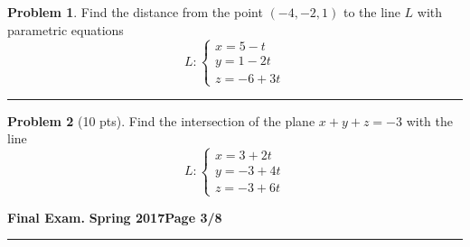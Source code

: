 \documentclass[12pt]{article}
\theoremstyle{definition}
\newtheorem{problem}{Problem}
\begin{document}
\bigskip
\begin{problem}
Find the distance from the point $(-4,-2,1)$ to the line $L$ with parametric equations
\begin{equation*}
L : \begin{cases}
x = 5 -t \\
y = 1 - 2t \\
z = -6 + 3t
\end{cases}
\end{equation*}
\vspace{6cm}
\begin{flushright}
\end{flushright}
\end{problem}
\hrule
\begin{problem}[10 pts]
Find the intersection of the plane $x+y+z=-3$ with the line
\begin{equation*}
L : \begin{cases}
x = 3 + 2t \\
y = -3 + 4t \\
z = -3 + 6t
\end{cases}
\end{equation*}
\vspace{6cm}
\begin{flushright}
\end{flushright}
\end{problem}
\newpage

\hfill{\large\bf Final Exam.}\hfill{\large\bf
  Spring 2017}\hfill{\large\bf Page 3/8}\hrule
\end{document}
